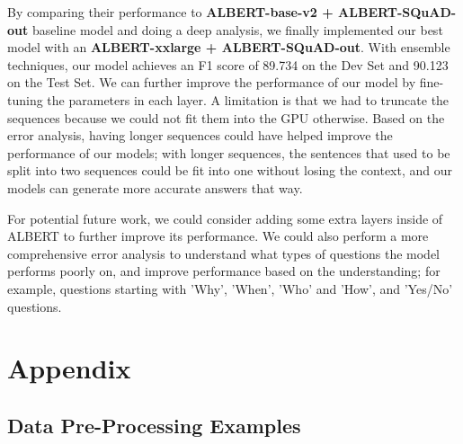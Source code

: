 \documentclass{article}
\begin{document}
By comparing their performance to \textbf{ALBERT-base-v2 + ALBERT-SQuAD-out} baseline model and doing a deep analysis, we finally implemented our best model with an \textbf{ALBERT-xxlarge + ALBERT-SQuAD-out}. With ensemble techniques, our model achieves an F1 score of 89.734 on the Dev Set and 90.123 on the Test Set. We can further improve the performance of our model by fine-tuning the parameters in each layer. A limitation is that we had to truncate the sequences because we could not fit them into the GPU otherwise. Based on the error analysis, having longer sequences could have helped improve the performance of our models; with longer sequences, the sentences that used to be split into two sequences could be fit into one without losing the context, and our models can generate more accurate answers that way.

For potential future work, we could consider adding some extra layers inside of ALBERT to further improve its performance. We could also perform a more comprehensive error analysis to understand what types of questions the model performs poorly on, and improve performance based on the understanding; for example, questions starting with 'Why', 'When', 'Who' and 'How', and 'Yes/No' questions.

\section{Appendix} \label{appendix}
\subsection{Data Pre-Processing Examples}
\end{document}

